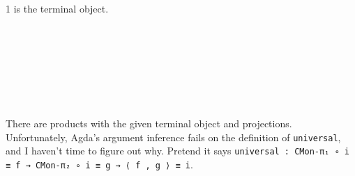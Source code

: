 1 is the terminal object.

\begin{code}%
\>  \<%
\\
\> \AgdaSymbol{:}  \<%
\\
\> \AgdaSymbol{=} \<%
\\
\>[0]\<[2]%
\>[2]\AgdaSymbol{\{}  \<[13]%
\>[13]\AgdaSymbol{=} \<%
\\
\>[0]\<[2]%
\>[2]\AgdaSymbol{;} \AgdaField{!} \<[13]%
\>[13]\AgdaSymbol{=}  \AgdaSymbol{\{}\AgdaSymbol{\}}   \<%
\\
\>[0]\<[2]%
\>[2]\AgdaSymbol{;}  \AgdaSymbol{=}  \AgdaBound{\_}  \<%
\\
\>[0]\<[2]%
\>[2]\AgdaSymbol{\}}\<%
\end{code}

There are products with the given terminal object and projections.
Unfortunately, Agda's argument inference fails on the definition of
{\tt universal}, and I haven't time to figure out why.  Pretend it says
{\tt universal : CMon-π₁ ∘ i ≡ f → CMon-π₂ ∘ i ≡ g → ⟨ f , g ⟩ ≡ i}.

